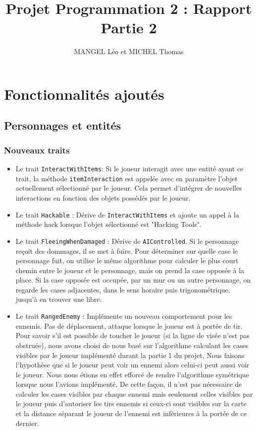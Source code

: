 \documentclass[10pt,a4paper]{article}
\title{Projet Programmation 2 : Rapport Partie 2}
\author{MANGEL Léo et MICHEL Thomas}
\date{}
\begin{document}
\maketitle

\section{Fonctionnalités ajoutés}

\subsection{Personnages et entités}
\subsubsection{Nouveaux traits}
\begin{itemize}
	\item Le trait \texttt{InteractWithItems}: Si le joueur interagit avec une entité ayant ce trait, la méthode \texttt{itemInteraction} est appelée avec en paramètre l'objet actuellement sélectionné par le joueur. Cela permet d'intégrer de nouvelles interactions en fonction des objets possédés par le joueur.
	\item Le trait \texttt{Hackable} : Dérive de \texttt{InteractWithItems} et ajoute un appel à la méthode hack lorsque l'objet sélectionné est "Hacking Tools".
	\item Le trait \texttt{FleeingWhenDamaged} : Dérive de \texttt{AIControlled}. Si le personnage reçoit des dommages, il se met à fuire. Pour déterminer sur quelle case le personnage fuit, on utilise le même algorithme pour calculer le plus court chemin entre le joueur et le personnage, mais on prend la case opposée à la place. Si la case opposée est occupée, par un mur ou un autre personnage, on regarde les cases adjacentes, dans le sens horaire puis trigonométrique, jusqu'à en trouver une libre.
	\item Le trait \texttt{RangedEnemy} : Implémente un nouveau comportement pour les ennemis. Pas de déplacement, attaque lorsque le joueur est à portée de tir. Pour savoir s'il est possible de toucher le joueur (si la ligne de visée n'est pas obstruée), nous avons choisi de nous basé sur l'algorithme calculant les cases visibles par le joueur implémenté durant la partie 1 du projet. Nous faisons l'hypothèse que si le joueur peut voir un ennemi alors celui-ci peut aussi voir le joueur. Nous nous étions en effet efforcé de rendre l'algorithme symétrique lorsque nous l'avions implémenté. De cette façon, il n'est pas nécessaire de calculer les cases visibles par chaque ennemi mais seulement celles visibles par le joueur puis d'autoriser les tirs ennemis si ceux-ci sont visibles sur la carte et la distance séparant le joueur de l'ennemi est inférieures à la portée de ce dernier.
\end{itemize}
\end{document}
